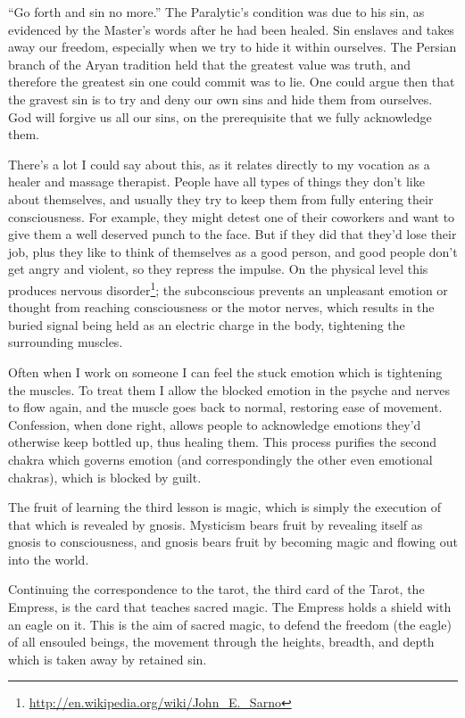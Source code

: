 ``Go forth and sin no more.'' The Paralytic's condition was due to his sin, as evidenced by the Master's words after he had been healed. Sin enslaves and takes away our freedom, especially when we try to hide it within ourselves. The Persian branch of the Aryan tradition held that the greatest value was truth, and therefore the greatest sin one could commit was to lie. One could argue then that the gravest sin is to try and deny our own sins and hide them from ourselves. God will forgive us all our sins, on the prerequisite that we fully acknowledge them.

There's a lot I could say about this, as it relates directly to my vocation as a healer and massage therapist. People have all types of things they don't like about themselves, and usually they try to keep them from fully entering their consciousness. For example, they might detest one of their coworkers and want to give them a well deserved punch to the face. But if they did that they'd lose their job, plus they like to think of themselves as a good person, and good people don't get angry and violent, so they repress the impulse. On the physical level this produces nervous disorder\footnote{\url{http://en.wikipedia.org/wiki/John_E._Sarno}}; the subconscious prevents an unpleasant emotion or thought from reaching consciousness or the motor nerves, which results in the buried signal being held as an electric charge in the body, tightening the surrounding muscles.

Often when I work on someone I can feel the stuck emotion which is tightening the muscles. To treat them I allow the blocked emotion in the psyche and nerves to flow again, and the muscle goes back to normal, restoring ease of movement. Confession, when done right, allows people to acknowledge emotions they'd otherwise keep bottled up, thus healing them. This process purifies the second chakra which governs emotion (and correspondingly the other even emotional chakras), which is blocked by guilt.

The fruit of learning the third lesson is magic, which is simply the execution of that which is revealed by gnosis. Mysticism bears fruit by revealing itself as gnosis to consciousness, and gnosis bears fruit by becoming magic and flowing out into the world.

Continuing the correspondence to the tarot, the third card of the Tarot, the Empress, is the card that teaches sacred magic. The Empress holds a shield with an eagle on it. This is the aim of sacred magic, to defend the freedom (the eagle) of all ensouled beings, the movement through the heights, breadth, and depth which is taken away by retained sin.

